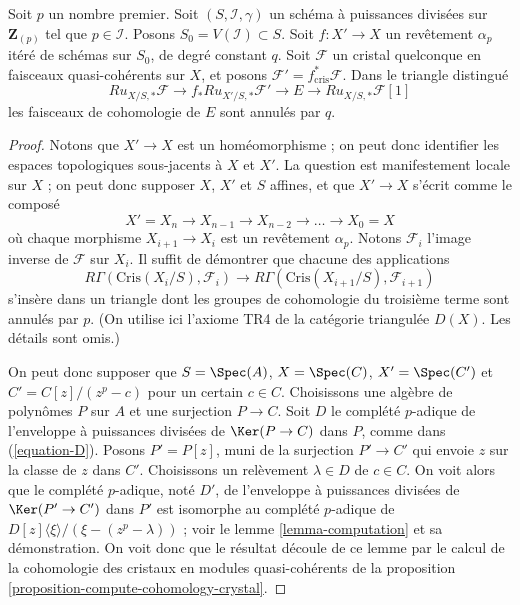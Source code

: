\begin{lemma}
\label{lemma-pullback-along-p-power-cover}
Soit $p$ un nombre premier. Soit $(S, \mathcal{I}, \gamma)$ un schéma à puissances
divisées sur $\mathbf{Z}_{(p)}$ tel que $p \in \mathcal{I}$. Posons
$S_0 = V(\mathcal{I}) \subset S$. Soit $f : X' \to X$ un revêtement
$\alpha_p$ itéré de schémas sur $S_0$, de degré constant $q$. Soit
$\mathcal{F}$ un cristal quelconque en faisceaux quasi-cohérents sur $X$, et posons
$\mathcal{F}' = f_{\text{cris}}^*\mathcal{F}$.
Dans le triangle distingué
$$
Ru_{X/S, *}\mathcal{F}
\longrightarrow
f_*Ru_{X'/S, *}\mathcal{F}'
\longrightarrow
E
\longrightarrow
Ru_{X/S, *}\mathcal{F}[1]
$$
les faisceaux de cohomologie de $E$ sont annulés par $q$.
\end{lemma}

\begin{proof}
Notons que $X' \to X$ est un homéomorphisme ; on peut donc identifier les espaces
topologiques sous-jacents à $X$ et $X'$. La question est manifestement locale sur $X$ ;
on peut donc supposer $X$, $X'$ et $S$ affines, et que $X' \to X$ s'écrit comme le
composé
$$
X' = X_n \to X_{n - 1} \to X_{n - 2} \to \ldots \to X_0 = X
$$
où chaque morphisme $X_{i + 1} \to X_i$ est un revêtement $\alpha_p$.
Notons $\mathcal{F}_i$ l'image inverse de $\mathcal{F}$ sur $X_i$.
Il suffit de démontrer que chacune des applications
$$
R\Gamma(\text{Cris}(X_i/S), \mathcal{F}_i)
\longrightarrow
R\Gamma(\text{Cris}(X_{i + 1}/S), \mathcal{F}_{i + 1})
$$
s'insère dans un triangle dont les groupes de cohomologie du troisième terme sont annulés
par $p$. (On utilise ici l'axiome TR4 de la catégorie triangulée $D(X)$. Les détails sont
omis.)

\medskip\noindent
On peut donc supposer que $S = \Spec(A)$, $X = \Spec(C)$, $X' = \Spec(C')$
et $C' = C[z]/(z^p - c)$ pour un certain $c \in C$. Choisissons une algèbre de polynômes
$P$ sur $A$ et une surjection $P \to C$. Soit $D$ le complété $p$-adique de
l'enveloppe à puissances divisées de $\Ker(P \to C)$ dans $P$, comme dans (\ref{equation-D}).
Posons $P' = P[z]$, muni de la surjection $P' \to C'$ qui envoie $z$ sur la classe de $z$
dans $C'$. Choisissons un relèvement $\lambda \in D$ de $c \in C$. On voit alors que
le complété $p$-adique, noté $D'$, de l'enveloppe à puissances divisées de
$\Ker(P' \to C')$ dans $P'$ est isomorphe au complété $p$-adique de
$D[z]\langle \xi \rangle/(\xi - (z^p - \lambda))$ ; voir le
lemme \ref{lemma-computation} et sa démonstration.
On voit donc que le résultat découle de ce lemme
par le calcul de la cohomologie des cristaux en modules quasi-cohérents de la
proposition \ref{proposition-compute-cohomology-crystal}.
\end{proof}

